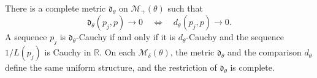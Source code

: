 \begin{theorem}\label{thm:positive-model-complete-metric}
There is a complete metric $\mathfrak d_\theta$ on $\mathcal M_+(\theta)$ such that
\begin{equation}\label{eq:positive-model-metric-convergence}
 \mathfrak d_\theta(p_j,p)\longrightarrow0
 \quad\Longleftrightarrow\quad d_\theta(p_j,p)\longrightarrow0.
\end{equation}
A sequence $p_j$ is $\mathfrak d_\theta$-Cauchy if and only if it is $d_\theta$-Cauchy and the sequence $1/L(p_j)$ is Cauchy in $\mathbb R$. On each $\mathcal M_\delta(\theta)$, the metric $\mathfrak d_\theta$ and the comparison $d_\theta$ define the same uniform structure, and the restriction of $\mathfrak d_\theta$ is complete.
\end{theorem}
